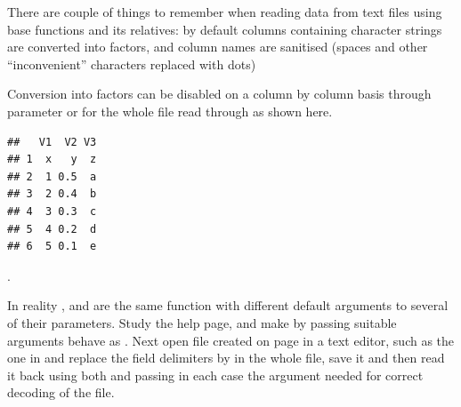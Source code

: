\documentclass[krantz2]{krantz}\usepackage{knitr}%
\begin{document}
\begin{warningbox}
There are couple of things to remember when reading data from text files using base \Rlang functions  and its relatives: by default columns containing character strings are converted into factors, and column names are sanitised (spaces and other ``inconvenient'' characters replaced with dots)

Conversion into factors can be disabled on a column by column basis through parameter  or for the whole file read through  as shown here.
\begin{knitrout}\footnotesize
{}\color{fgcolor}\begin{kframe}
\begin{alltt}
\hlstd{(}\hlstd{,}  \hlstd{=} \hlstd{)}
\end{alltt}
\begin{verbatim}
##   V1  V2 V3
## 1  x   y  z
## 2  1 0.5  a
## 3  2 0.4  b
## 4  3 0.3  c
## 5  4 0.2  d
## 6  5 0.1  e
\end{verbatim}
\end{kframe}
\end{knitrout}
.
\end{warningbox}

\begin{playground}
In reality  ,  and  are the same function with different default arguments to several of their parameters. Study the help page, and make by passing suitable arguments  behave as . Next open file  created on page \pageref{chunck:my:file1} in a text editor, such as the one in \RStudio and replace the field delimiters \code{,} by \code{;} in the whole file, save it   and then read it back using both  and  passing in each case the argument needed for correct decoding of the file.
\end{playground}

\subsubsection[readr]{}\label{sec:files:readr}
\end{document}

